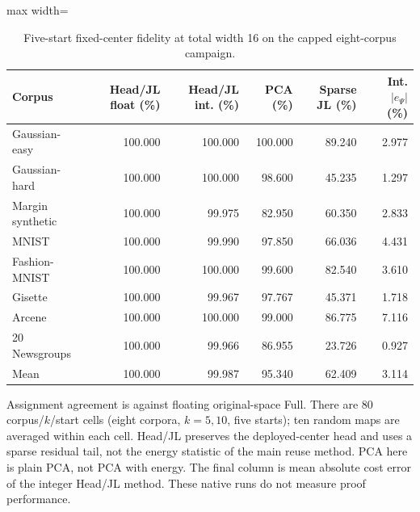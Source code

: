 \begin{table}[tp]
\caption{Five-start fixed-center fidelity at total width 16 on the capped eight-corpus campaign.}\label{tab:fixed-five-starts}
\centering\small
\begin{adjustbox}{max width=\textwidth}
\begin{tabular}{@{}lrrrrr@{}}
\toprule
Corpus & Head/JL float (\%) & Head/JL int. (\%) & PCA (\%) & Sparse JL (\%) & Int. $|e_\Psi|$ (\%) \\
\midrule
Gaussian-easy & 100.000 & 100.000 & 100.000 & 89.240 & 2.977 \\
Gaussian-hard & 100.000 & 100.000 & 98.600 & 45.235 & 1.297 \\
Margin synthetic & 100.000 & 99.975 & 82.950 & 60.350 & 2.833 \\
MNIST & 100.000 & 99.990 & 97.850 & 66.036 & 4.431 \\
Fashion-MNIST & 100.000 & 100.000 & 99.600 & 82.540 & 3.610 \\
Gisette & 100.000 & 99.967 & 97.767 & 45.371 & 1.718 \\
Arcene & 100.000 & 100.000 & 99.000 & 86.775 & 7.116 \\
20 Newsgroups & 100.000 & 99.966 & 86.955 & 23.726 & 0.927 \\
Mean & 100.000 & 99.987 & 95.340 & 62.409 & 3.114 \\
\bottomrule
\end{tabular}
\end{adjustbox}
\par\smallskip\begin{minipage}{0.98\textwidth}\footnotesize Assignment agreement is against floating original-space Full. There are 80 corpus/$k$/start cells (eight corpora, $k=5,10$, five starts); ten random maps are averaged within each cell. Head/JL preserves the deployed-center head and uses a sparse residual tail, not the energy statistic of the main reuse method. PCA here is plain PCA, not PCA with energy. The final column is mean absolute cost error of the integer Head/JL method. These native runs do not measure proof performance.\end{minipage}
\end{table}
